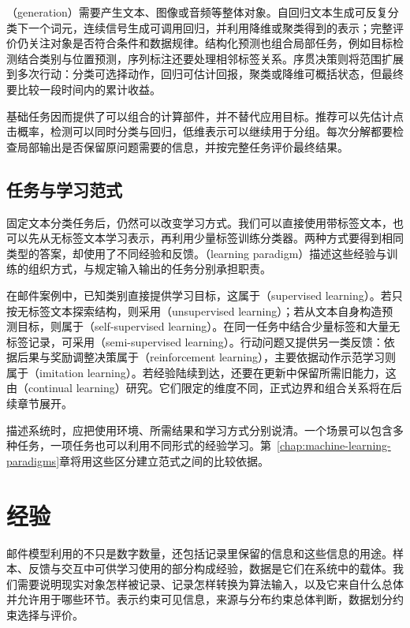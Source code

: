 （generation）需要产生文本、图像或音频等整体对象。自回归文本生成可反复分类下一个词元，连续信号生成可调用回归，并利用降维或聚类得到的表示；完整评价仍关注对象是否符合条件和数据规律。结构化预测也组合局部任务，例如目标检测结合类别与位置预测，序列标注还要处理相邻标签关系。序贯决策则将范围扩展到多次行动：分类可选择动作，回归可估计回报，聚类或降维可概括状态，但最终要比较一段时间内的累计收益。

基础任务因而提供了可以组合的计算部件，并不替代应用目标。推荐可以先估计点击概率，检测可以同时分类与回归，低维表示可以继续用于分组。每次分解都要检查局部输出是否保留原问题需要的信息，并按完整任务评价最终结果。

\subsection{任务与学习范式}
\label{sec:task-and-learning-paradigm}

固定文本分类任务后，仍然可以改变学习方式。我们可以直接使用带标签文本，也可以先从无标签文本学习表示，再利用少量标签训练分类器。两种方式要得到相同类型的答案，却使用了不同经验和反馈。（learning paradigm）描述这些经验与训练的组织方式，与规定输入输出的任务分别承担职责。

在邮件案例中，已知类别直接提供学习目标，这属于（supervised learning）。若只按无标签文本探索结构，则采用（unsupervised learning）；若从文本自身构造预测目标，则属于（self-supervised learning）。在同一任务中结合少量标签和大量无标签记录，可采用（semi-supervised learning）。行动问题又提供另一类反馈：依据后果与奖励调整决策属于（reinforcement learning），主要依据动作示范学习则属于（imitation learning）。若经验陆续到达，还要在更新中保留所需旧能力，这由（continual learning）研究。它们限定的维度不同，正式边界和组合关系将在后续章节展开。

描述系统时，应把使用环境、所需结果和学习方式分别说清。一个场景可以包含多种任务，一项任务也可以利用不同形式的经验学习。第~\ref{chap:machine-learning-paradigms}章将用这些区分建立范式之间的比较依据。

\section{经验}
\label{sec:machine-learning-data}

邮件模型利用的不只是数字数量，还包括记录里保留的信息和这些信息的用途。样本、反馈与交互中可供学习使用的部分构成经验，数据是它们在系统中的载体。我们需要说明现实对象怎样被记录、记录怎样转换为算法输入，以及它来自什么总体并允许用于哪些环节。表示约束可见信息，来源与分布约束总体判断，数据划分约束选择与评价。

